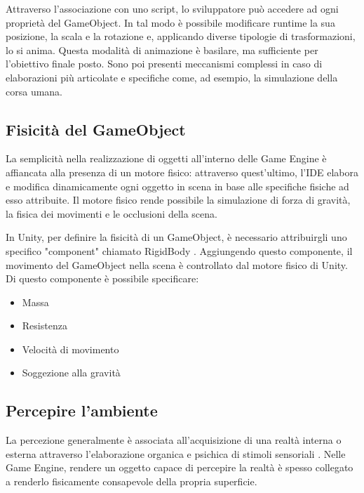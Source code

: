 \medskip

Attraverso l'associazione con uno script, lo sviluppatore può accedere ad ogni proprietà del GameObject. In tal modo è possibile modificare runtime la sua posizione, la scala e la rotazione e, applicando diverse tipologie di trasformazioni, lo si anima. Questa modalità di animazione è basilare, ma sufficiente per l'obiettivo finale posto. Sono poi presenti meccanismi complessi in caso di elaborazioni più articolate e specifiche come, ad esempio, la simulazione della corsa umana.

\subsection{Fisicità del GameObject}

La semplicità nella realizzazione di oggetti all'interno delle Game Engine è affiancata alla presenza di un motore fisico: attraverso quest'ultimo, l'IDE elabora e modifica dinamicamente ogni oggetto in scena in base alle specifiche fisiche ad esso attribuite. Il motore fisico rende possibile la simulazione di forza di gravità, la fisica dei movimenti e le occlusioni della scena.

\medskip

In Unity, per definire la fisicità di un GameObject, è necessario attribuirgli uno specifico "component" chiamato RigidBody \cite{unity_rigidbody}. Aggiungendo questo componente, il movimento del GameObject nella scena è controllato dal motore fisico di Unity. Di questo componente è possibile specificare:
\begin{itemize}
    \item Massa
    \item Resistenza
    \item Velocità di movimento
    \item Soggezione alla gravità
\end{itemize}

\subsection{Percepire l'ambiente}

La percezione generalmente è associata all'acquisizione di una realtà interna o esterna attraverso l'elaborazione organica e psichica di stimoli sensoriali \cite{treccani}. Nelle Game Engine, rendere un oggetto capace di percepire la realtà è spesso collegato a renderlo fisicamente consapevole della propria superficie.

